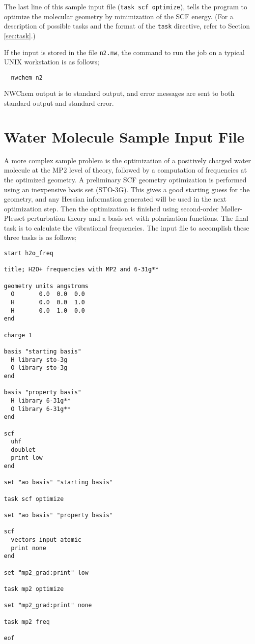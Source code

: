 The last line of this sample input file ({\tt task scf optimize}),
tells the program to optimize the molecular geometry by minimization
of the SCF energy.  (For a description of possible tasks and the format
of the {\tt task} directive, refer to Section \ref{sec:task}.)

If the input is stored in the file \verb+n2.nw+, the command to run
the job on a typical UNIX workstation is as follows;

\begin{verbatim}
  nwchem n2
\end{verbatim}

NWChem output is to standard output, and error messages are sent to
both standard output and standard error.

\section{Water Molecule Sample Input File}
\label{sec:realsample}

A more complex sample problem is the optimization of a positively
charged water molecule at the MP2 level of theory, followed by a computation of
frequencies at the optimized geometry.  A preliminary SCF geometry
optimization is performed using an inexpensive basis set (STO-3G).
This gives a good starting guess for the geometry, and any Hessian
information generated will be used in the next optimization step.
Then the optimization is finished using second-order M{\o}ller-Plesset
perturbation theory and a basis set with polarization functions.  The
final task is to calculate the vibrational frequencies.  The input
file to accomplish these three tasks is as follows;

\begin{verbatim}
start h2o_freq

title; H2O+ frequencies with MP2 and 6-31g**

geometry units angstroms
  O       0.0  0.0  0.0
  H       0.0  0.0  1.0
  H       0.0  1.0  0.0
end

charge 1

basis "starting basis"
  H library sto-3g
  O library sto-3g
end

basis "property basis"
  H library 6-31g**
  O library 6-31g**
end

scf
  uhf
  doublet
  print low
end

set "ao basis" "starting basis"

task scf optimize

set "ao basis" "property basis"

scf
  vectors input atomic
  print none
end

set "mp2_grad:print" low

task mp2 optimize

set "mp2_grad:print" none

task mp2 freq

eof
\end{verbatim}

